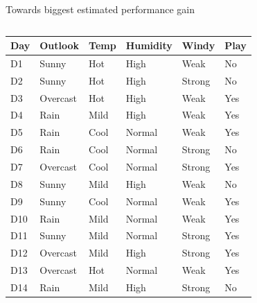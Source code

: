 \documentclass[usenames,dvipsnames]{beamer}
\begin{document}
\begin{frame}{Towards biggest estimated performance gain}
\begin{columns}[T,onlytextwidth]
    \begin{column}{.7\textwidth}
        \begin{scriptsize}
            \begin{tabular}{lllll||l} \toprule
                \textbf{Day} & \textbf{Outlook}  & \textbf{Temp} & \textbf{Humidity} & \textbf{Windy}  & \textbf{Play} \\ \midrule
                D1  & Sunny    & Hot  & High     & Weak   & No   \\
                D2  & Sunny    & Hot  & High     & Strong & No   \\
                D3  & Overcast & Hot  & High     & Weak   & Yes  \\
                D4  & Rain     & Mild & High     & Weak   & Yes  \\
                D5  & Rain     & Cool & Normal   & Weak   & Yes  \\
                D6  & Rain     & Cool & Normal   & Strong & No   \\
                D7  & Overcast & Cool & Normal   & Strong & Yes  \\
                D8  & Sunny    & Mild & High     & Weak   & No   \\
                D9  & Sunny    & Cool & Normal   & Weak   & Yes  \\
                D10 & Rain     & Mild & Normal   & Weak   & Yes  \\
                D11 & Sunny    & Mild & Normal   & Strong & Yes  \\
                D12 & Overcast & Mild & High     & Strong & Yes  \\
                D13 & Overcast & Hot  & Normal   & Weak   & Yes  \\
                D14 & Rain     & Mild & High     & Strong & No  \\ \bottomrule
            \end{tabular}
        \end{scriptsize}
    \end{column}

    \begin{column}{0.4\textwidth}
        \begin{scriptsize}
        \end{scriptsize}
    \end{column}
\end{columns}
\end{frame}
	
\end{document}
